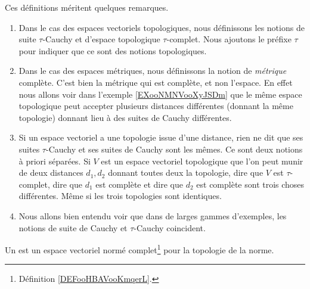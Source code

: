 \begin{normaltext}
    Ces définitions méritent quelques remarques.
    \begin{enumerate}
        \item
            Dans le cas des espaces vectoriels topologiques, nous définissons les notions de suite \( \tau\)-Cauchy et d'espace topologique \( \tau\)-complet. Nous ajoutons le préfixe \( \tau\) pour indiquer que ce sont des notions topologiques.
        \item
            Dans le cas des espaces métriques, nous définissons la notion de \emph{métrique} complète. C'est bien la métrique qui est complète, et non l'espace. En effet nous allons voir dans l'exemple \ref{EXooNMNVooXyJSDm} que le même espace topologique peut accepter plusieurs distances différentes (donnant la même topologie) donnant lieu à des suites de Cauchy différentes.
        \item
            Si un espace vectoriel a une topologie issue d'une distance, rien ne dit que ses suites \( \tau\)-Cauchy et ses suites de Cauchy sont les mêmes. Ce sont deux notions à priori séparées. Si \( V\) est un espace vectoriel topologique que l'on peut munir de deux distances \( d_1, d_2\) donnant toutes deux la topologie, dire que \( V\) est \( \tau\)-complet, dire que \( d_1\) est complète et dire que \( d_2\) est complète sont trois choses différentes. Même si les trois topologies sont identiques.
        \item
            Nous allons bien entendu voir que dans de larges gammes d'exemples, les notions de suite de Cauchy et \( \tau\)-Cauchy coincident.
    \end{enumerate}
\end{normaltext}

\begin{definition}  \label{DefVKuyYpQ}
    Un  est un espace vectoriel normé complet\footnote{Définition \ref{DEFooHBAVooKmqerL}.} pour la topologie de la norme.
\end{definition}

